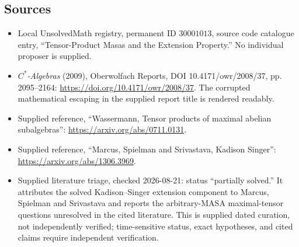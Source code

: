 \documentclass[11pt]{article}
\begin{document}
\subsection{Sources}
\begin{itemize}
\item Local UnsolvedMath registry, permanent ID \(30001013\), source code catalogue entry, ``Tensor-Product Masas and the Extension Property.'' No individual proposer is supplied.
\item \emph{\(C^*\)-Algebras} (2009), Oberwolfach Reports, DOI 10.4171/owr/2008/37, pp. 2095--2164: \url{https://doi.org/10.4171/owr/2008/37}. The corrupted mathematical escaping in the supplied report title is rendered readably.
\item Supplied reference, ``Wassermann, Tensor products of maximal abelian subalgebras'': \url{https://arxiv.org/abs/0711.0131}.
\item Supplied reference, ``Marcus, Spielman and Srivastava, Kadison Singer'': \url{https://arxiv.org/abs/1306.3969}.
\item Supplied literature triage, checked 2026-08-21: status ``partially solved.'' It attributes the solved Kadison--Singer extension component to Marcus, Spielman and Srivastava and reports the arbitrary-MASA maximal-tensor questions unresolved in the cited literature. This is supplied dated curation, not independently verified; time-sensitive status, exact hypotheses, and cited claims require independent verification.
\end{itemize}
\end{document}
